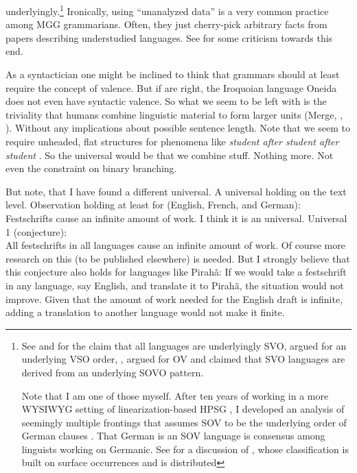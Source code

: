 \documentclass[output=paper,colorlinks,citecolor=brown]{langscibook}
\begin{document}
underlyingly.\footnote{
See  and  for the claim that all languages are
underlyingly SVO,
\citet{McCawley70a-u} argued for an underlying VSO order, \citet[]{Bach71a-u}, \citet{Ross73a-u} argued for OV and
 claimed that SVO languages are derived from an
underlying SOVO pattern.

Note that I am one of those myself. After ten years of working in a more WYSIWYG setting of
linearization-based HPSG \citep{Mueller2004b}, I developed an analysis of seemingly multiple frontings that assumes SOV
to be the underlying order of German clauses \parencites{Mueller2005c,Mueller2005d,MuellerGS}. That
German is an SOV language is consensus among linguists working on Germanic. See
 for a discussion of , whose classification is built on
surface occurrences and is distributed 
}
Ironically, using ``unanalyzed data'' is a very common practice among MGG
grammarians. Often, they just cherry-pick arbitrary facts from papers describing understudied
languages. See  for some criticism towards this end.
 
As a syntactician one might be inclined to think that grammars should at least require the concept of valence. But
if \citet{KM2012a} are right, the Iroquoian language Oneida does not even have syntactic valence. So
what we seem to be left with is the triviality that humans combine linguistic material to form
larger units (Merge, \citealp{HCF2002a}, \citealp[, ]{MuellerCoreGram}). Without any implications about possible sentence length. Note that we seem to
require unheaded, flat structures for phenomena like \emph{student after student after student} \parencites{Matsuyama2004a}{Jackendoff2008a}{Bargmann2015a}[Section~4.1]{MuellerCxG}. So
the universal would be that we combine stuff. Nothing more. Not even the constraint on binary branching.

But note, that I have found a different universal. A universal holding on the text level. 
\ea
Observation holding at least for (English, French, and German):\\
Festschrifts cause an infinite amount of work.
\z
I think it is an universal.
\ea
Universal 1 (conjecture):\\
All festschrifts in all languages cause an infinite amount of work.
\z
Of course more research on this (to be published elsewhere) is needed. But I strongly believe that
this conjecture also holds for languages like Pirahã: If we would take a festschrift in
any language, say English, and translate it to Pirahã, the situation would not improve. Given that
the amount of work needed for the English draft is infinite, adding a translation to another
language would not make it finite. 
\end{document}
